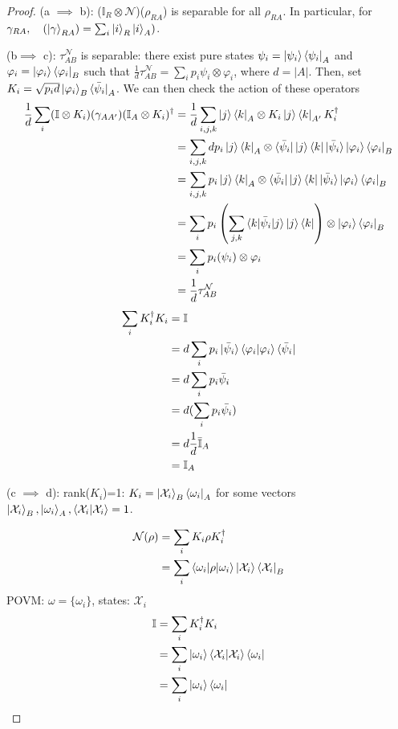 \documentclass[../../note.tex]{subfiles}
\begin{document}
\begin{proof} 
(a $\implies$ b): ($\mathbb{I}_R\otimes \mathcal{N}$)($\rho_{RA}$) is separable for all $\rho_{RA}$. In particular, for $\gamma_{RA}, \quad (\ket{\gamma}_{RA})=\sum_i \ket{i}_R \ket{i}_A)$.

(b$\implies$ c): $\tau_{AB}^{\mathcal{N}}$ is separable: there exist pure states $\psi_i = \ket{\psi_i}\bra{\psi_i}_A$ and $\varphi_i = \ket{\varphi_i}\bra{\varphi_i}_B$ such that $\frac{1}{d} \tau^{\mathcal{N}}_{AB}=\sum_i p_i \psi_i \otimes \varphi_i$, where $d=|A|$. Then, set $K_i = \sqrt{p_i d}\ket{\varphi_i}_B \bra{\bar{\psi}_i}_A$. We can then check the action of these operators
\begin{align}
    \frac{1}{d} \sum_i (\mathbb{I}\otimes K_i) (\gamma_{AA'})(\mathbb{I}_A \otimes K_i)^{\dagger}&= \frac{1}{d} \sum_{i,j,k} \ket{j}\bra{k}_A \otimes K_i \ket{j}\bra{k}_{A'} K_i^{\dagger} \\
    &= \sum_{i,j,k} d p_i \ket{j}\bra{k}_A \otimes \bra{\bar{\psi}_i}\ket{j}\bra{k}\ket{\bar{\psi}_i} \ket{\varphi_i}\bra{\varphi_i}_B\\
    &=\sum_{i,j,k} p_i \ket{j}\bra{k}_A \otimes \bra{\bar{\psi}_i}\ket{j}\bra{k}\ket{\bar{\psi}_i} \ket{\varphi_i}\bra{\varphi_i}_B\\
    &=\sum_i p_i \left(\sum_{j,k} \braket{k | \bar{\psi}_i | j} \ket{j} \bra{k}\right)\otimes \ket{\varphi_i}\bra{\varphi_i}_B\\
    &=\sum_i p_i (\psi_i) \otimes \varphi_i \\
    &= \frac{1}{d} \tau_{AB}^{\mathcal{N}}
\end{align}
\begin{align}
    \sum_{i} K_i^{\dagger} K_i &=\mathbb{I} \\
   &= d \sum_i p_i \ket{\bar{\psi}_i} \braket{\varphi_i | \varphi_i}\bra{\bar{\psi}_i}\\
    &= d \sum_i p_i \bar{\psi}_i \\
    &= d(\sum_i p_i \bar{\psi_i})\\
    &=d \frac{1}{d} \bar{\mathbb{I}}_A\\
    &= \mathbb{I}_A
\end{align}

(c $\implies$ d): rank($K_i$)=1: $K_i = \ket{\mathcal{X}_i}_B \bra{\omega_i}_A$ for some vectors $\ket{\mathcal{X}_i}_B ,\ket{\omega_i}_A, \braket{\mathcal{X}_i |\mathcal{X}_i}=1$.

\begin{align}
    \mathcal{N} (\rho) &= \sum_i K_i \rho K_i^{\dagger} \\
    &= \sum_i \braket{\omega_i | \rho | \omega_i} \ket{\mathcal{X}_i} \bra{\mathcal{X}_i}_B 
\end{align}
POVM: $\omega = \{\omega_i\}$, states: $\mathcal{X}_i$
\begin{align}
    \mathbb{I} &= \sum_i K_i^{\dagger}K_i \\
    &= \sum_i \ket{\omega_i} \braket{\mathcal{X}_i | \mathcal{X}_i}\bra{\omega_i} \\
    &= \sum_i \ket{\omega_i}\bra{\omega_i}
\end{align}
 

\end{proof}
\end{document}
